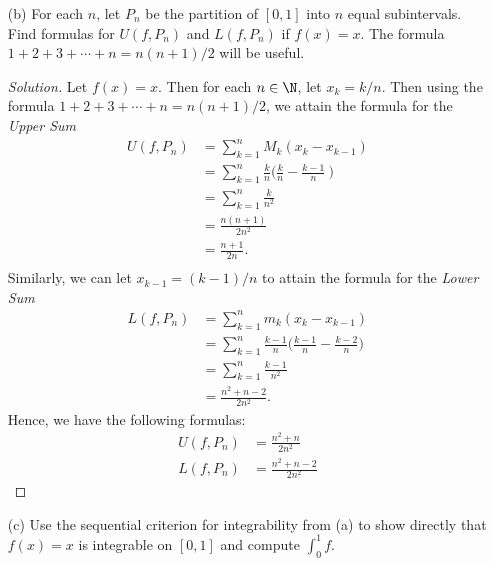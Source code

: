\begin{enumerate}
\begin{proof}
		Now we shall prove the backwards direction. Choose \( \epsilon = 1/n   \). Assume there exists a partition \( P_{n} \) such that for some \( N \in \N  \), we have that for any \( n \geq N  \)
		\[  U(f) - L(f) \leq U(f, P_{n})  - L(f, P_{n}) < \frac{ 1 }{ n } \to 0. \]
		But by Theorem 1.2.6, we have that \( U(f) = L(f) \). Hence, \( f  \) must be integrable.
		\end{proof}
	\item[(b)] For each \( n  \), let \( P_{n} \) be the partition of \( [0,1] \) into \( n \) equal subintervals. Find formulas for \( U(f, P_{n}) \) and \( L(f,P_{n}) \) if \( f(x) = x  \). The formula \( 1 + 2 + 3 + \dotsb + n = n(n+1)/2  \) will be useful.
		\begin{proof}[Solution]
			Let \( f(x) = x  \). Then for each \( n \in \N  \), let \( x_{k } = k / n  \). Then using the formula \( 1 + 2 + 3 + \dotsb + n = n(n+1) / 2 \), we attain the formula for the \textit{Upper Sum}  
			\begin{align*}
			   U(f, P_{n}) &= \sum_{ k=1 }^{ n } M_{k } ( x_{k } -  x_{k -1 } ) \\
						   &= \sum_{ k=1 }^{ n } \frac{ k  }{ n } \Big(  \frac{ k  }{ n } - \frac{ k-1 }{ n } \ \Big) \\
						   &= \sum_{ k=1 }^{ n } \frac{ k  }{ n^2 } \\
						   &= \frac{ n(n+1) }{ 2n^2 } \\
						   &= \frac{ n+1 }{ 2n }. \\ 
			\end{align*}
		Similarly, we can let \( x_{k-1} = (k-1)/n \) to attain the formula for the \textit{Lower Sum} 
		\begin{align*}
		    L(f, P_{n})&= \sum_{ k=1 }^{ n } m_{k } ( x_{k} - x_{k-1}) \\
					   &= \sum_{ k=1 }^{ n } \frac{ k-1 }{ n } \Big( \frac{ k-1 }{ n } - \frac{ k-2 }{ n }  \Big) \\
					   &= \sum_{ k=1 }^{ n } \frac{ k-1 }{ n^2 } \\
					   &= \frac{ n^{2} + n - 2  }{ 2 n^{2} }. 
		\end{align*}
		Hence, we have the following formulas:
		\begin{align*}
		    U(f, P_{n}) &= \frac{ n^2 + n  }{ 2n^2 } \\
			L(f, P_{n}) &=  \frac{ n^{2} + n - 2  }{ 2n^2 } 
		\end{align*}
		\end{proof}
	\item[(c)] Use the sequential criterion for integrability from (a) to show directly that \( f(x) = x  \) is integrable on \( [0,1]  \) and compute \( \int_{ 0 }^{ 1 } f   \).

\end{enumerate}
